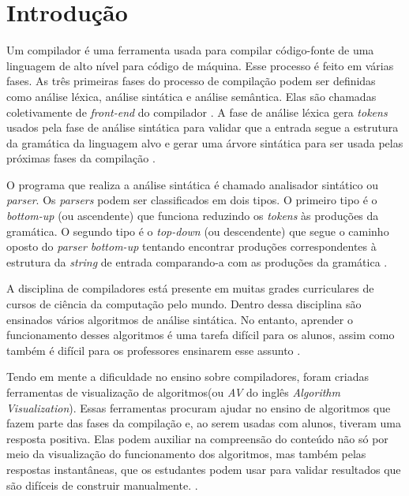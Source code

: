 \chapter{Introdução}
\label{cap:introducao}

Um compilador é uma ferramenta usada para compilar código-fonte de uma linguagem de alto nível para código de máquina. Esse processo é feito em várias fases. As três primeiras fases do processo de compilação podem ser definidas como análise léxica, análise sintática e análise semântica. Elas são chamadas coletivamente de \textit{front-end} do compilador \cite{mogensen2024introduction}. A fase de análise léxica gera \textit{tokens} usados pela fase de análise sintática para validar que a entrada segue a estrutura da gramática da linguagem alvo e gerar uma árvore sintática para ser usada pelas próximas fases da compilação \cite{thain2020introduction}.

O programa que realiza a análise sintática é chamado analisador sintático ou \textit{parser}. Os \textit{parsers} podem ser classificados em dois tipos. O primeiro tipo é o \textit{bottom-up} (ou ascendente) que funciona reduzindo os \textit{tokens} às produções da gramática. O segundo tipo é o \textit{top-down} (ou descendente) que segue o caminho oposto do \textit{parser bottom-up} tentando encontrar produções correspondentes à estrutura da \textit{string} de entrada comparando-a com as produções da gramática \cite{cooper2022engineering}.

A disciplina de compiladores está presente em muitas grades curriculares de cursos de ciência da computação pelo mundo. Dentro dessa disciplina são ensinados vários algoritmos de análise sintática. No entanto, aprender o funcionamento desses algoritmos é uma tarefa difícil para os alunos, assim como também é difícil para os professores ensinarem esse assunto \cite{sangal2018pavt}.

Tendo em mente a dificuldade no ensino sobre compiladores, foram criadas ferramentas de visualização de algoritmos(ou \textit{AV} do inglês \textit{Algorithm Visualization}). Essas ferramentas procuram ajudar no ensino de algoritmos que fazem parte das fases da compilação e, ao serem usadas com alunos, tiveram uma resposta positiva. Elas podem auxiliar na compreensão do conteúdo não só por meio da visualização do funcionamento dos algoritmos, mas também pelas respostas instantâneas, que os estudantes podem usar para validar resultados que são difíceis de construir manualmente. \cite{10.1145/3002136}.


